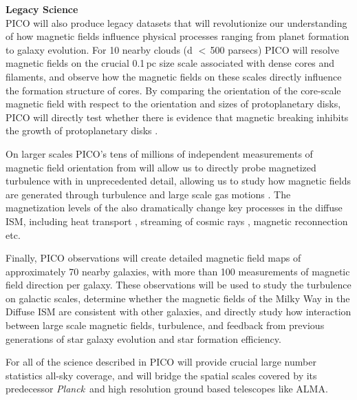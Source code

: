 \documentclass[PICOReport.tex]{subfiles}
\begin{document}
{\bf Legacy Science}\\
PICO will also produce legacy datasets that will revolutionize our understanding of how magnetic fields influence physical processes ranging from planet formation to galaxy evolution.  For 10 nearby clouds (d $<$\,500 parsecs) PICO will resolve magnetic fields on the crucial 0.1\,pc size scale associated with dense cores and filaments, and observe how the magnetic fields on these scales directly influence the formation structure of cores.  By comparing the orientation of the core-scale magnetic field with respect to the orientation and sizes of protoplanetary disks, PICO will directly test whether there is evidence that magnetic breaking inhibits the growth of protoplanetary disks \citep{allen_2003,li_2014}. 

On larger scales PICO's tens of millions of independent measurements of magnetic field orientation from will allow us to directly probe magnetized turbulence with in unprecedented detail, allowing us to study how magnetic fields are generated through turbulence and large scale gas motions \citep{Xu_2018}.   The magnetization levels of the also dramatically change key processes in the diffuse ISM, including heat transport \cite{Lazarian:2006}, streaming of cosmic rays \cite{Lazarian:2016}, magnetic reconnection \cite{Lazarian_Vishniac:1999} etc.

Finally, PICO observations will create detailed magnetic field maps of approximately 70 nearby galaxies, with more than 100 measurements of magnetic field direction per galaxy.  These observations will be used to study the turbulence on galactic scales, determine whether the magnetic fields of the Milky Way in the Diffuse ISM are consistent with other galaxies, and directly study how interaction between large scale magnetic fields, turbulence, and feedback from previous generations of star galaxy evolution and star formation efficiency.

For  all of the science described in PICO will provide crucial large number statistics all-sky coverage, and will bridge the spatial scales covered by its predecessor {\em Planck}~and high resolution ground based telescopes like ALMA.



%
%
\end{document}
